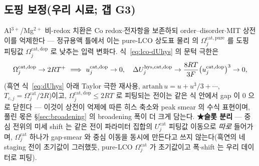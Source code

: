 \subsection{도핑 보정(우리 시료; 갭 G3)}\label{sec:lco-hys-dope}
Al$^{3+}$/Mg$^{2+}$ 비-redox 치환은 Co redox$\cdot$전자항을 보존하되 order--disorder$\cdot$MIT 상전이를
억제한다 --- 정규용액 틀에서 이는 pure-LCO 상도표 물리\cite{reimers1992,vanderven1998} 의 $\Omega_j^\mathrm{cat,pure}$ 를 도핑 피팅값
$\Omega_j^\mathrm{cat,dop}$ 로 낮추는 입력 변화다. 식~\eqref{eq:lco-dUhys} 의 문턱 극한은
\begin{equation}
\Omega_j^\mathrm{cat,dop}\to2RT^+\ \Longrightarrow\
u_j^\mathrm{cat,dop}\to0,\quad
\Delta U_j^{\hys,\mathrm{cat,dop}}\to\frac{8RT}{3F}\big(u_j^\mathrm{cat,dop}\big)^3\to0,
\label{eq:lco-dope}
\end{equation}
(흑연 식~\eqref{eq:dUhys} 아래 Taylor 극한 재사용, $\mathrm{artanh}\,u=u+u^3/3+\cdots$,
$T_{c,j}=\Omega_j^\mathrm{cat}/2R$)이고, $\Omega_j^\mathrm{cat,dop}\le2RT$ 로 피팅되는 전이는 같은 식 안에서
gap 이 0 으로 닫힌다 --- 이것이 상전이 억제에 따른 히스 축소와 peak smear 의 수식 표현이며, 풀린 몫은
\S\ref{sec:broadening} 의 broadening 폭이 더 크게 담는다. \textbf{★슬롯 분리} --- 중심 전위의 미세 shift 는
같은 전이 파라미터 집합의 $U_j^\mathrm{cat}$ 피팅값 이동으로 \emph{따로} 들어가며, $\Omega_j^\mathrm{cat}$ 하나가
gap$\cdot$smear 와 중심 이동을 동시에 만든다고 쓰지 않는다(흑연의 네 staging 전이 초기값이 그러했듯,
pure-LCO $\Omega_j^\mathrm{cat}$ 가 초기값이고 폭$\cdot$shift 는 우리 데이터로 피팅).

